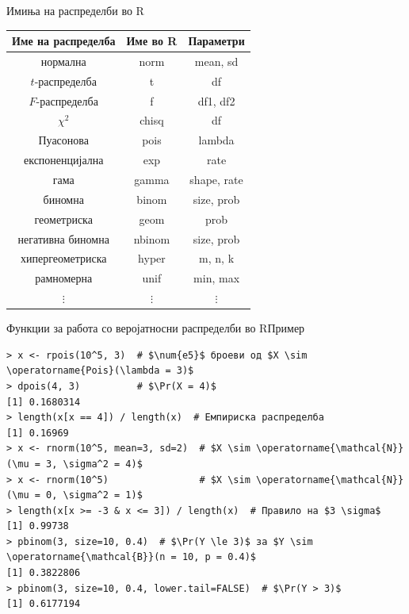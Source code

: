 \documentclass[hyperref={unicode}, xcolor={svgnames, table},
usepdftitle=false]{beamer}
\theoremstyle{remark}
\begin{document}
\begin{frame}{Имиња на распределби во R}
  \begin{table}
    \centering
    \begin{tabular}{c C C}
      \toprule
      Име на распределба & \normalfont Име во R & \normalfont Параметри \\
      \midrule
      нормална & norm & mean, sd \\
      \(t\)-распределба & t & df \\
      \(F\)-распределба & f & df1, df2 \\
      \({\chi}^2\) & chisq & df \\
      Пуасонова & pois & lambda \\
      експоненцијална & exp & rate \\
      гама & gamma & shape, rate \\
      биномна & binom & size, prob \\
      геометриска & geom & prob \\
      негативна биномна & nbinom & size, prob \\
      хипергеометриска & hyper & m, n, k \\
      рамномерна & unif & min, max \\
      \(\vdots\) & \(\vdots\) & \(\vdots\) \\
      \bottomrule
    \end{tabular}
  \end{table}
\end{frame}

\begin{frame}[fragile]{Функции за работа со веројатносни распределби во R}{Пример}
\begin{verbatim}
> x <- rpois(10^5, 3)  # $\num{e5}$ броеви од $X \sim \operatorname{Pois}(\lambda = 3)$
> dpois(4, 3)          # $\Pr(X = 4)$
[1] 0.1680314
> length(x[x == 4]) / length(x)  # Емпириска распределба
[1] 0.16969
> x <- rnorm(10^5, mean=3, sd=2)  # $X \sim \operatorname{\mathcal{N}}(\mu = 3, \sigma^2 = 4)$
> x <- rnorm(10^5)                # $X \sim \operatorname{\mathcal{N}}(\mu = 0, \sigma^2 = 1)$
> length(x[x >= -3 & x <= 3]) / length(x)  # Правило на $3 \sigma$
[1] 0.99738
> pbinom(3, size=10, 0.4)  # $\Pr(Y \le 3)$ за $Y \sim \operatorname{\mathcal{B}}(n = 10, p = 0.4)$
[1] 0.3822806
> pbinom(3, size=10, 0.4, lower.tail=FALSE)  # $\Pr(Y > 3)$
[1] 0.6177194
\end{verbatim}
\end{frame}
\end{document}
